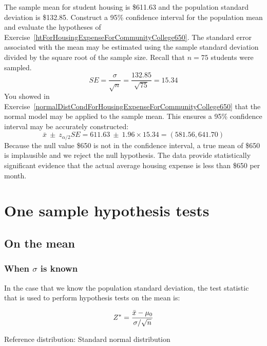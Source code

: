 \begin{example}{The sample mean for student housing is \$611.63 and the population standard deviation is \$132.85. Construct a 95\% confidence interval for the population mean and evaluate the hypotheses of Exercise~\ref{htForHousingExpenseForCommunityCollege650}.}
The standard error associated with the mean may be estimated using the sample standard deviation divided by the square root of the sample size. Recall that $n=75$ students were sampled.
$$ SE = \frac{\sigma}{\sqrt{n}} = \frac{132.85}{\sqrt{75}} = 15.34 $$
You showed in Exercise~\ref{normalDistCondForHousingExpenseForCommunityCollege650} that the normal model may be applied to the sample mean. This ensures a 95\% confidence interval may be accurately constructed:
$$\bar{x}\ \pm\ z_{\alpha/2} SE = 611.63\ \pm\ 1.96 \times  15.34 = (581.56, 641.70) $$
Because the null value \$650 is not in the confidence interval, a true mean of \$650 is implausible and we reject the null hypothesis. The data provide statistically significant evidence that the actual average housing expense is less than \$650 per month.
\end{example}








\section{One sample hypothesis tests}

\subsection{On the mean}

\subsubsection{When $\sigma$ is known}

In the case that we know the population standard deviation, the test statistic that is used to perform hypothesis
tests on the mean is:

\begin{termBox}{
\begin{equation}
Z^{*}	 =   \frac{ \bar{x} - \mu_{0} }{ \sigma / \sqrt{n} }	\label{eqnTestStatSigmaKnown}\\
\end{equation}

Reference distribution:	Standard normal distribution
}
\end{termBox}


